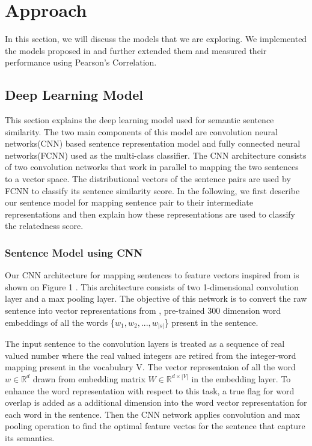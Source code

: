 \documentclass{article} %
\begin{document}
	
	\section{Approach}
	In this section, we will discuss the models that we are exploring. We implemented the models proposed in \cite{CNN,ecnu} and further extended them and measured their performance using Pearson's Correlation.
	\subsection{Deep Learning Model}
		This section explains the deep learning model used for semantic sentence similarity. The two main components of this model are convolution neural networks(CNN) based sentence representation model and fully connected neural networks(FCNN) used as the multi-class classifier. The CNN architecture consists of two convolution networks that work in parallel to mapping the two sentences to a vector space. The distributional vectors of the sentence pairs are used by FCNN to classify its sentence similarity score. In the following, we first describe our sentence model for mapping sentence pair to their intermediate representations and then explain how these representations are used to classify the relatedness score.
	
	\subsubsection{Sentence Model using CNN}
	Our CNN architecture for mapping sentences to feature
	vectors inspired from \cite{CNN} is shown on Figure 1 . This architecture consists of two 1-dimensional convolution layer and a max pooling layer. The objective of this network is to convert the raw sentence into vector representations from \cite{glove}, pre-trained 300 dimension word embeddings of all the words \{$w_{1}, w_{2},...,w_{|s|}$\} present in the sentence.
	
	The input sentence to the convolution layers is treated as a sequence of real valued number where the real valued integers are retired from the integer-word mapping present in the vocabulary V. The vector representaion of all the word $ w \in \mathbb{R}^{d}  $ drawn from embedding matrix  $ W \in \mathbb{R}^{d \times |V|} $ in the embedding layer. To enhance the word representation with respect to this task, a true flag for word overlap is added as a additional dimension into the word vector representation for each word in the sentence. Then the CNN network applies convolution and max pooling operation to find the optimal feature vectos for the sentence that capture its semantics. 
	
\end{document}
